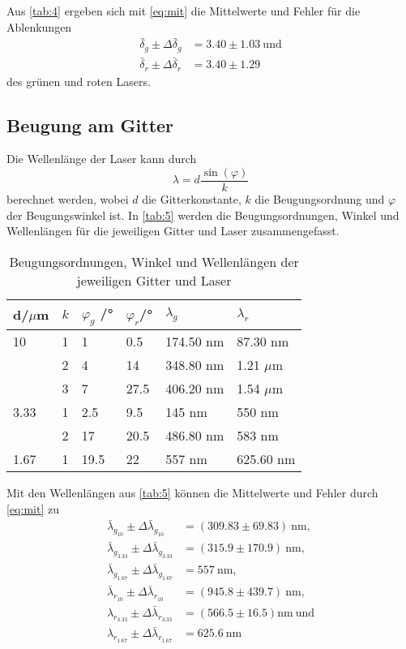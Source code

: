 Aus \autoref{tab:4} ergeben sich mit \autoref{eq:mit} die Mittelwerte und Fehler für die Ablenkungen
\begin{align*}
  \bar \delta_g \pm \Delta \bar \delta_g&=3.40 \pm 1.03\ \textrm{und}\\
  \bar \delta_r \pm \Delta \bar \delta_r&=3.40 \pm 1.29
\end{align*}
des grünen und roten Lasers.

\subsection{Beugung am Gitter}
Die Wellenlänge der Laser kann durch 
\begin{equation*}
  \lambda=d\frac{\sin(\varphi)}{k}
\end{equation*}
berechnet werden, wobei $d$ die Gitterkonstante, $k$ die Beugungsordnung und $\varphi$ der Beugungswinkel ist. In \autoref{tab:5} werden die Beugungsordnungen, Winkel und Wellenlängen für die jeweiligen Gitter und Laser zusammengefasst.
\begin{table}[H]
  \centering
  \caption{Beugungsordnungen, Winkel und Wellenlängen der jeweiligen Gitter und Laser}
  \begin{tabular}{l|l|l|l|l|l}
  d/$\mu$m & $k$ & $\varphi_g$ /°& $\varphi_r$/° & $\lambda_g$ & $\lambda_r$\\\hline
  10 & 1 & 1 & 0.5 & 174.50 nm & 87.30 nm \\
     & 2 & 4 & 14 & 348.80 nm & 1.21 $\mu$m  \\
     & 3 & 7 & 27.5 & 406.20 nm & 1.54 $\mu$m \\\hline
  3.33 & 1 & 2.5 & 9.5 & 145 nm & 550 nm\\
     & 2 &17 & 20.5 & 486.80 nm & 583 nm \\\hline
  1.67 & 1 & 19.5 & 22 & 557 nm & 625.60 nm\\\hline
  \end{tabular}
  \label{tab:5}
\end{table}
Mit den Wellenlängen aus \autoref{tab:5} können die Mittelwerte und Fehler durch \autoref{eq:mit} zu
\begin{align*}
  \bar \lambda_{g_10} \pm \Delta \bar \lambda_{g_10}&=(309.83 \pm 69.83)\ \textrm{nm},\\
  \bar \lambda_{g_3.33} \pm \Delta \bar \lambda_{g_3.33}&=(315.9 \pm 170.9)\ \textrm{nm},\\
  \bar \lambda_{g_1.67} \pm \Delta \bar \lambda_{g_1.67}&=557\ \textrm{nm},\\
  \bar \lambda_{r_10} \pm \Delta \bar \lambda_{r_10}&=(945.8 \pm 439.7)\ \textrm{nm},\\
  \lambda_{r_3.33} \pm \Delta \bar \lambda_{r_3.33}&=(566.5 \pm 16.5) \textrm{nm}\ \textrm{und}\\
  \lambda_{r_1.67} \pm \Delta \bar \lambda_{r_1.67}&=625.6\ \textrm{nm}
\end{align*}
